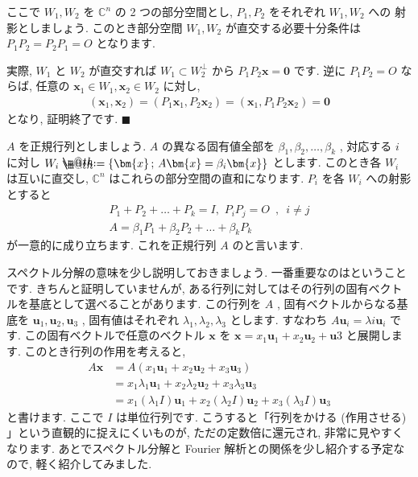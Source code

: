 \documentclass[openany, a4paper, oneside]{book}
\makeatletter
\newcommand*{\defeq}{\mathrel{\rlap{%
\raisebox{0.3ex}{$\m@th\cdot$}}%
\raisebox{-0.3ex}{$\m@th\cdot$}}%
=}
\theoremstyle{break}
\theoremstyle{breakdefn}
\newcommand{\bC}{\mathbb{C}}
\makeatother
\begin{document}
ここで $W_1,W_2$ を $\bC^n$ の 2 つの部分空間とし,  $P_1,P_2$ をそれぞれ $W_1,W_2$ への
射影としましょう. このとき部分空間 $W_1,W_2$ が直交する必要十分条件は $P_1 P_2 = P_2 P_1 = O$ となります.

実際,  $W_1$ と $W_2$ が直交すれば $W_1 \subset W_2 ^{\perp}$ から $P_1 P_2 \bm{x}= \bm{0}$ です.
逆に $P_1 P_2 = O$ ならば, 任意の $\bm{x}_1 \in W_1,\bm{x}_2 \in W_2$ に対し,
    \begin{align}
        (\bm{x}_1,\bm{x}_2) = (P_1 \bm{x}_1,P_2 \bm{x}_2) = (\bm{x}_1,P_1 P_2\bm{x}_2) = \bm{0}
    \end{align}
となり, 証明終了です.  $\blacksquare$

$A$ を正規行列としましょう.  $A$ の異なる固有値全部を $\beta _1, \beta _2,\dots,\beta _k$ , 対応する
$i$ に対し $W_i \defeq \{ \bm{x} \, ; \, A\bm{x}=\beta _i \bm{x} \}$ とします.
このとき各 $W_i$ は互いに直交し,  $\bC^n$ はこれらの部分空間の直和になります.
$P_i$ を各 $W_i$ への射影とすると
\begin{gather}
P_1 + P_2 + \dots + P_k = I , \,\, P_i P_j = O \,\,\, , \,\,\,i \not = j \\
A = \beta _1 P_1 + \beta _2 P_2 + \dots + \beta _k P_k
\end{gather}
が一意的に成り立ちます. これを正規行列 $A$ のと言います.

スペクトル分解の意味を少し説明しておきましょう.
一番重要なのはということです.
きちんと証明していませんが, ある行列に対してはその行列の固有ベクトルを基底として選べることがあります.
この行列を $A$ , 固有ベクトルからなる基底を $\bm{u}_1,\bm{u}_2,\bm{u}_3$ ,
固有値はそれぞれ $\lambda_1,\lambda_2,\lambda_3$ とします.
すなわち $A\bm{u}_i=\lambda{i} \bm{u}_i$ です.
この固有ベクトルで任意のベクトル $\bm{x}$ を $\bm{x}=x_1\bm{u}_1+x_2\bm{u}_2+\bm{u}3$ と展開します.
このとき行列の作用を考えると,
    \begin{align}
        A \bm{x}
        &=
        A (x_1 \bm{u}_1 + x_2 \bm{u}_2 + x_3 \bm{u}_3 )\\
        &=
        x_1 \lambda_1  \bm{u}_1 + x_2 \lambda_2  \bm{u}_2 + x_3 \lambda_3  \bm{u}_3\\
        &=
        x_1 ( \lambda_1 I ) \bm{u}_1 + x_2 ( \lambda_2 I ) \bm{u}_2 + x_3 (\lambda_3 I ) \bm{u}_3
    \end{align}
と書けます. ここで $I$ は単位行列です.
こうすると「行列をかける (作用させる) 」という直観的に捉えにくいものが, ただの定数倍に還元され, 非常に見やすくなります.
あとでスペクトル分解と Fourier 解析との関係を少し紹介する予定なので, 軽く紹介してみました.
\end{document}
